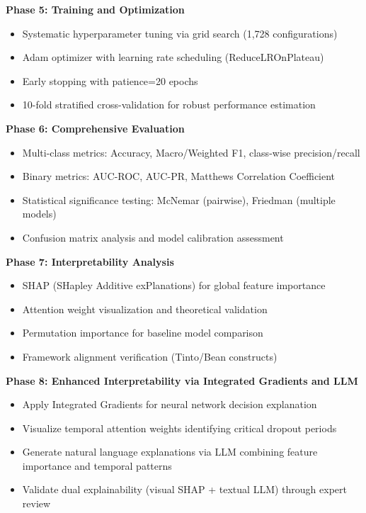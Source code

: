 \textbf{Phase 5: Training and Optimization}
\begin{itemize}
\item Systematic hyperparameter tuning via grid search (1,728 configurations)
\item Adam optimizer with learning rate scheduling (ReduceLROnPlateau)
\item Early stopping with patience=20 epochs
\item 10-fold stratified cross-validation for robust performance estimation
\end{itemize}

\textbf{Phase 6: Comprehensive Evaluation}
\begin{itemize}
\item Multi-class metrics: Accuracy, Macro/Weighted F1, class-wise precision/recall
\item Binary metrics: AUC-ROC, AUC-PR, Matthews Correlation Coefficient
\item Statistical significance testing: McNemar (pairwise), Friedman (multiple models)
\item Confusion matrix analysis and model calibration assessment
\end{itemize}

\textbf{Phase 7: Interpretability Analysis}
\begin{itemize}
\item SHAP (SHapley Additive exPlanations) for global feature importance
\item Attention weight visualization and theoretical validation
\item Permutation importance for baseline model comparison
\item Framework alignment verification (Tinto/Bean constructs)
\end{itemize}

\textbf{Phase 8: Enhanced Interpretability via Integrated Gradients and LLM}
\begin{itemize}
\item Apply Integrated Gradients for neural network decision explanation
\item Visualize temporal attention weights identifying critical dropout periods
\item Generate natural language explanations via LLM combining feature importance and temporal patterns
\item Validate dual explainability (visual SHAP + textual LLM) through expert review
\end{itemize}

